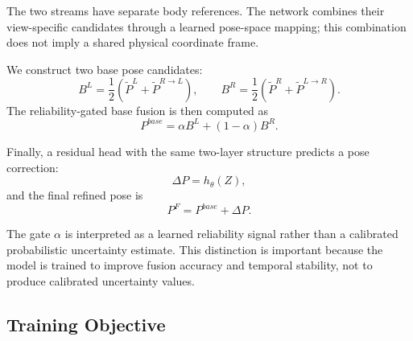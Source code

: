 \documentclass[preprint,12pt]{elsarticle}
\begin{document}
The two streams have separate body references. The network combines their view-specific candidates through a learned pose-space mapping; this combination does not imply a shared physical coordinate frame.

We construct two base pose candidates:
\[
B^{L} = \frac{1}{2}(\tilde{P}^{L} + \tilde{P}^{R \rightarrow L}),
\qquad
B^{R} = \frac{1}{2}(\tilde{P}^{R} + \tilde{P}^{L \rightarrow R}).
\]
The reliability-gated base fusion is then computed as
\[
P^{base}
=
\alpha B^{L}
+
(1-\alpha)B^{R}.
\]

Finally, a residual head with the same two-layer structure predicts a pose correction:
\[
\Delta P = h_{\theta}(Z),
\]
and the final refined pose is
\[
P^{F} = P^{base} + \Delta P.
\]

The gate \(\alpha\) is interpreted as a learned reliability signal rather than a calibrated probabilistic uncertainty estimate. This distinction is important because the model is trained to improve fusion accuracy and temporal stability, not to produce calibrated uncertainty values.

\subsection{Training Objective}
\label{subsec:training_objective}
\end{document}
